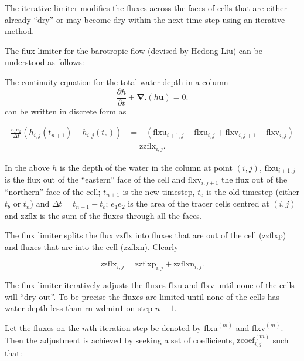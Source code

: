 The iterative limiter modifies the fluxes across the faces of cells that are either already ``dry''
or may become dry within the next time-step using an iterative method. 

The flux limiter for the barotropic flow (devised by Hedong Liu) can be understood as follows: 

The continuity equation for the total water depth in a column 
\begin{equation} \label{dyn_wd_continuity}
 \frac{\partial h}{\partial t} + \mathbf{\nabla.}(h\mathbf{u}) = 0 .
\end{equation} 
can be written in discrete form  as  

\begin{align} \label{dyn_wd_continuity_2}
\frac{e_1 e_2}{\Delta t} ( h_{i,j}(t_{n+1}) - h_{i,j}(t_e) ) 
&= - ( \mathrm{flxu}_{i+1,j} - \mathrm{flxu}_{i,j}  + \mathrm{flxv}_{i,j+1} - \mathrm{flxv}_{i,j} ) \\
&= \mathrm{zzflx}_{i,j} .
\end{align} 

In the above $h$ is the depth of the water in the column at point $(i,j)$,
$\mathrm{flxu}_{i+1,j}$ is the flux out of the ``eastern'' face of the cell and
$\mathrm{flxv}_{i,j+1}$ the flux out of the ``northern'' face of the cell; $t_{n+1}$ is
the new timestep, $t_e$ is the old timestep (either $t_b$ or $t_n$) and $ \Delta t =
t_{n+1} - t_e$; $e_1 e_2$ is the area of the tracer cells centred at $(i,j)$ and
$\mathrm{zzflx}$ is the sum of the fluxes through all the faces.

The flux limiter splits the flux $\mathrm{zzflx}$ into fluxes that are out of the cell
(zzflxp) and fluxes that are into the cell (zzflxn).  Clearly

\begin{equation} \label{dyn_wd_zzflx_p_n_1}
\mathrm{zzflx}_{i,j} = \mathrm{zzflxp}_{i,j} + \mathrm{zzflxn}_{i,j} .  
\end{equation} 

The flux limiter iteratively adjusts the fluxes $\mathrm{flxu}$ and $\mathrm{flxv}$ until
none of the cells will ``dry out''. To be precise the fluxes are limited until none of the
cells has water depth less than $\mathrm{rn\_wdmin1}$ on step $n+1$.

Let the fluxes on the $m$th iteration step be denoted by $\mathrm{flxu}^{(m)}$ and
$\mathrm{flxv}^{(m)}$.  Then the adjustment is achieved by seeking a set of coefficients,
$\mathrm{zcoef}_{i,j}^{(m)}$ such that:


